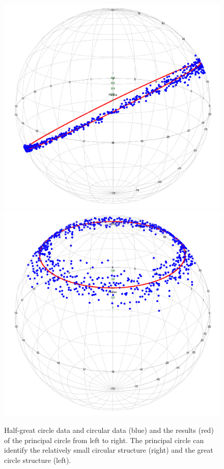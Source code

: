\begin{figure}[h]
    \centering
    \includegraphics[scale=0.13]{figures/PC(halfcircle).png}
    \hspace{1cm}
    \includegraphics[scale=0.13]{figures/PC(circular).png}
    \caption{Half-great circle data and circular data (blue) and the results (red) of the principal circle from left to right. The principal circle can identify the relatively small circular structure (right) and the great circle structure (left).}
    \label{fig:PC}
\end{figure}


